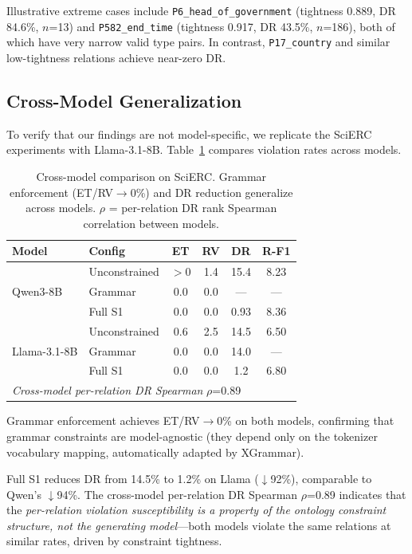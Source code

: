 \documentclass[11pt,a4paper]{article}
\begin{document}
Illustrative extreme cases include \texttt{P6\_head\_of\_government} (tightness 0.889, DR 84.6\%, $n$=13) and \texttt{P582\_end\_time} (tightness 0.917, DR 43.5\%, $n$=186), both of which have very narrow valid type pairs.
In contrast, \texttt{P17\_country} and similar low-tightness relations achieve near-zero DR.

\subsection{Cross-Model Generalization}
\label{sec:crossmodel}

To verify that our findings are not model-specific, we replicate the SciERC experiments with Llama-3.1-8B.
Table~\ref{tab:crossmodel} compares violation rates across models.

\begin{table}[t]
\centering
\small
\caption{Cross-model comparison on SciERC. Grammar enforcement (ET/RV$\to$0\%) and DR reduction generalize across models. $\rho$ = per-relation DR rank Spearman correlation between models.}
\label{tab:crossmodel}
\begin{tabular}{llcccc}
\toprule
\textbf{Model} & \textbf{Config} & \textbf{ET} & \textbf{RV} & \textbf{DR} & \textbf{R-F1} \\
\midrule
\multirow{3}{*}{Qwen3-8B}
& Unconstrained & $>$0 & 1.4 & 15.4 & 8.23 \\
& Grammar       & 0.0  & 0.0 & ---  & --- \\
& Full S1       & 0.0  & 0.0 & 0.93 & 8.36 \\
\midrule
\multirow{3}{*}{Llama-3.1-8B}
& Unconstrained & 0.6  & 2.5 & 14.5 & 6.50 \\
& Grammar       & 0.0  & 0.0 & 14.0 & --- \\
& Full S1       & 0.0  & 0.0 & 1.2  & 6.80 \\
\bottomrule
\multicolumn{6}{l}{\textit{Cross-model per-relation DR Spearman} $\rho$=0.89} \\
\end{tabular}
\end{table}

Grammar enforcement achieves ET/RV$\to$0\% on both models, confirming that grammar constraints are model-agnostic (they depend only on the tokenizer vocabulary mapping, automatically adapted by XGrammar).

Full S1 reduces DR from 14.5\% to 1.2\% on Llama ($\downarrow$92\%), comparable to Qwen's $\downarrow$94\%.
The cross-model per-relation DR Spearman $\rho$=0.89 indicates that the \emph{per-relation violation susceptibility is a property of the ontology constraint structure, not the generating model}---both models violate the same relations at similar rates, driven by constraint tightness.
\end{document}
